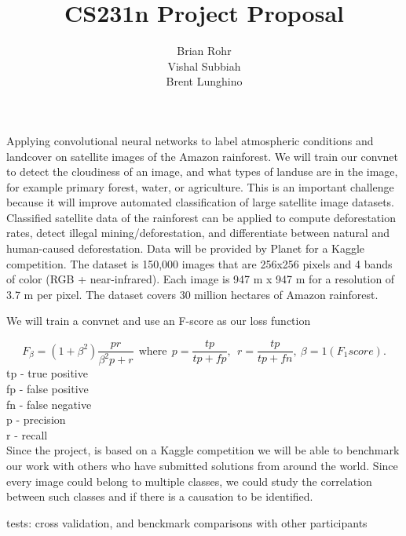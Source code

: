 \documentclass[12pt]{article}
\title{CS231n Project Proposal}
\author{Brian Rohr\\Vishal Subbiah\\Brent Lunghino}
\begin{document}
\maketitle	

Applying convolutional neural networks to label atmospheric conditions and landcover on satellite images of the Amazon rainforest. We will train our convnet to detect the cloudiness of an image, and what types of landuse are in the image, for example primary forest, water, or agriculture. This is an important challenge because it will improve automated classification of large satellite image datasets. Classified satellite data of the rainforest can be applied to compute deforestation rates, detect illegal mining/deforestation, and differentiate between natural and human-caused deforestation.
Data will be provided by Planet for a Kaggle competition. The dataset is 150,000 images that are 256x256 pixels and 4 bands of color (RGB + near-infrared). Each image is 947 m x 947 m for a resolution of 3.7 m per pixel. The dataset covers 30 million hectares of Amazon rainforest. 

We will train a convnet and use an F-score as our loss function

\begin{equation} \label{eq:F_score}
F_{\beta}=(1 + \beta^2) \frac{pr}{\beta^2 p+r}\ \ \mathrm{where}\ \ p = \frac{tp}{tp+fp},\ \ r = \frac{tp}{tp+fn},\ \beta = 1 (F_1 score).
\end{equation}
tp - true positive \\
fp - false positive \\
fn - false negative \\
p - precision \\
r - recall\\

Since the project, is based on a Kaggle competition we will be able to benchmark our work with others who have submitted solutions from around the world. Since every image could belong to multiple classes, we could study the correlation between such classes and if there is a causation to be identified.

tests:
cross validation, and benckmark comparisons with other participants
\end{document}
